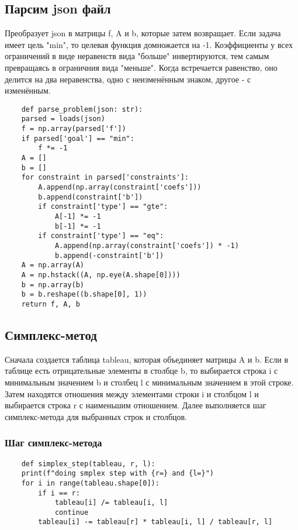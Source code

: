 \documentclass{article}
\begin{document}
\subsection{Парсим json файл}

Преобразует json в матрицы f, A и b, которые затем возвращает. Если задача имеет цель "min", то целевая функция домножается на -1.
Коэффициенты у всех ограничений в виде неравенств вида "больше" инвертируются, тем самым превращаясь в ограничния вида "меньше".
Когда встречается равенство, оно делится на два неравенства, одно с неизменённым знаком, другое - с изменённым.

\begin{listing}[H]
    \begin{verbatim}
    def parse_problem(json: str):
    parsed = loads(json)
    f = np.array(parsed['f'])
    if parsed['goal'] == "min":
        f *= -1
    A = []
    b = []
    for constraint in parsed['constraints']:
        A.append(np.array(constraint['coefs']))
        b.append(constraint['b'])
        if constraint['type'] == "gte":
            A[-1] *= -1
            b[-1] *= -1
        if constraint['type'] == "eq":
            A.append(np.array(constraint['coefs']) * -1)
            b.append(-constraint['b'])
    A = np.array(A)
    A = np.hstack((A, np.eye(A.shape[0])))
    b = np.array(b)
    b = b.reshape((b.shape[0], 1))
    return f, A, b
    \end{verbatim}
\end{listing}

\subsection{Симплекс-метод}

Сначала создается таблица tableau, которая объединяет матрицы A и b. Если в таблице есть отрицательные элементы в столбце b, то выбирается строка i с минимальным значением b и столбец l с минимальным значением в этой строке. Затем находятся отношения между элементами строки i и столбцом l и выбирается строка r с наименьшим отношением. Далее выполняется шаг симплекс-метода для выбранных строк и столбцов.

\subsubsection{Шаг симплекс-метода}
\begin{listing}[H]
    \begin{verbatim}
    def simplex_step(tableau, r, l):
    print(f"doing smplex step with {r=} and {l=}")
    for i in range(tableau.shape[0]):
        if i == r:
            tableau[i] /= tableau[i, l]
            continue
        tableau[i] -= tableau[r] * tableau[i, l] / tableau[r, l]
    \end{verbatim}
\end{listing}
\end{document}
